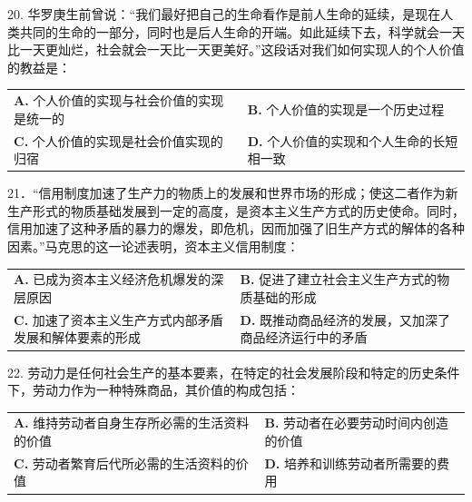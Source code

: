 \documentclass[UTF8,11pt]{ctexart}
\begin{document}
20. 华罗庚生前曾说：“我们最好把自己的生命看作是前人生命的延续，是现在人类共同的生命的一部分，同时也是后人生命的开端。如此延续下去，科学就会一天比一天更灿烂，社会就会一天比一天更美好。”这段话对我们如何实现人的个人价值的教益是：


\begin{center}\begin{tabular}{>{\raggedright\arraybackslash}p{\dimexpr(\linewidth-4\tabcolsep)/2\relax}>{\raggedright\arraybackslash}p{\dimexpr(\linewidth-4\tabcolsep)/2\relax}}
\textbf{A.} 个人价值的实现与社会价值的实现是统一的 & \textbf{B.} 个人价值的实现是一个历史过程\\[.35em]
\textbf{C.} 个人价值的实现是社会价值实现的归宿 & \textbf{D.} 个人价值的实现和个人生命的长短相一致\\[.35em]\end{tabular}\end{center}

21．“信用制度加速了生产力的物质上的发展和世界市场的形成；使这二者作为新生产形式的物质基础发展到一定的高度，是资本主义生产方式的历史使命。同时，信用加速了这种矛盾的暴力的爆发，即危机，因而加强了旧生产方式的解体的各种因素。”马克思的这一论述表明，资本主义信用制度：


\begin{center}\begin{tabular}{>{\raggedright\arraybackslash}p{\dimexpr(\linewidth-4\tabcolsep)/2\relax}>{\raggedright\arraybackslash}p{\dimexpr(\linewidth-4\tabcolsep)/2\relax}}
\textbf{A.} 已成为资本主义经济危机爆发的深层原因 & \textbf{B.} 促进了建立社会主义生产方式的物质基础的形成\\[.35em]
\textbf{C.} 加速了资本主义生产方式内部矛盾发展和解体要素的形成 & \textbf{D.} 既推动商品经济的发展，又加深了商品经济运行中的矛盾\\[.35em]\end{tabular}\end{center}

22. 劳动力是任何社会生产的基本要素，在特定的社会发展阶段和特定的历史条件下，劳动力作为一种特殊商品，其价值的构成包括：


\begin{center}\begin{tabular}{>{\raggedright\arraybackslash}p{\dimexpr(\linewidth-4\tabcolsep)/2\relax}>{\raggedright\arraybackslash}p{\dimexpr(\linewidth-4\tabcolsep)/2\relax}}
\textbf{A.} 维持劳动者自身生存所必需的生活资料的价值 & \textbf{B.} 劳动者在必要劳动时间内创造的价值\\[.35em]
\textbf{C.} 劳动者繁育后代所必需的生活资料的价值 & \textbf{D.} 培养和训练劳动者所需要的费用\\[.35em]\end{tabular}\end{center}
\end{document}
